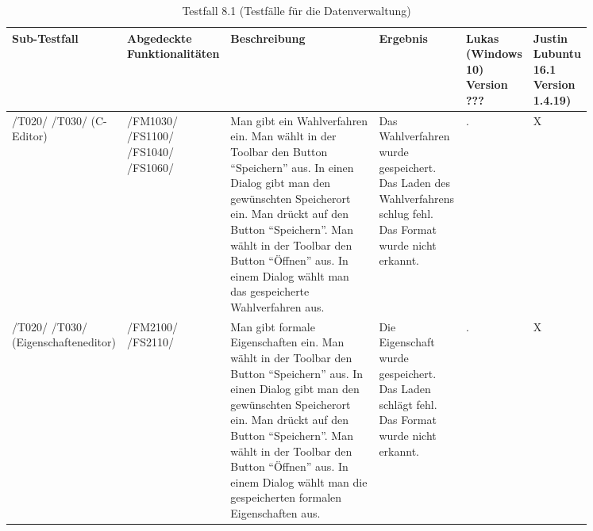 \begin{table}[]
\caption{Testfall 8.1 (Testfälle für die Datenverwaltung)}
\centering
	\begin{tabular}{| p{0.10\linewidth} | p{0.15\linewidth} | p{0.27\linewidth} |
	p{0.15\linewidth} | p{0.09\linewidth} | p{0.09\linewidth} |}
	\hline
	\textbf{Sub-Testfall} &
	\textbf{Abgedeckte Funktionalitäten} &
	\textbf{Beschreibung} &
	\textbf{Ergebnis} & \textbf{Lukas}
	(Windows 10) Version ??? &
	\textbf{Justin} Lubuntu 16.1 Version 1.4.19) 
\\
\hline
/T020/ /T030/ (C-Editor) &
/FM1030/ /FS1100/ /FS1040/ /FS1060/ &
Man gibt ein Wahlverfahren ein. Man wählt in der Toolbar den Button "`Speichern"' aus. In einen Dialog gibt man den gewünschten Speicherort ein. Man drückt auf den Button "`Speichern"'. Man wählt in der Toolbar den Button "`Öffnen"' aus. In einem Dialog wählt man das gespeicherte Wahlverfahren aus.
 &
Das Wahlverfahren wurde gespeichert. Das Laden des Wahlverfahrens schlug fehl. Das Format wurde nicht erkannt. &
\centering . & X
\\
\hline 
/T020/ /T030/ (Eigenschafteneditor) &
/FM2100/ /FS2110/ &
Man gibt formale Eigenschaften ein. Man wählt in der Toolbar den Button "`Speichern"' aus. In einen Dialog gibt man den gewünschten Speicherort ein. Man drückt auf den Button "`Speichern"'. Man wählt in der Toolbar den Button "`Öffnen"' aus. In einem Dialog wählt man die gespeicherten formalen Eigenschaften aus.
 &
Die Eigenschaft wurde gespeichert. Das Laden schlägt fehl. Das Format wurde nicht erkannt. &
\centering . & X
\\
\hline 


\end{tabular}
\end{table}